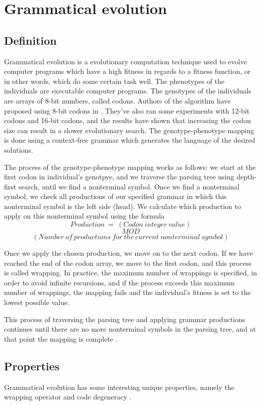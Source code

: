 \section{Grammatical evolution}
\subsection{Definition}
Grammatical evolution is a evolutionary computation technique used to evolve computer programs which have a high fitness in regards to a fitness function, or in other words, which do some certain task well. The phenotypes of the individuals are executable computer programs. The genotypes of the individuals are arrays of 8-bit numbers, called codons. Authors of the algorithm have proposed using 8-bit codons in \citep{neill2003grammaticalevolution}. They've also ran some experiments with 12-bit codons and 16-bit codons, and the results have shown that increasing the codon size can result in a slower evolutionary search. The genotype-phenotype mapping is done using a context-free grammar which generates the language of the desired solutions.

The process of the genotype-phenotype mapping works as follows: we start at the first codon in individual's genotpye, and we traverse the parsing tree using depth-first search, until we find a nonterminal symbol. Once we find a nonterminal symbol, we check all productions of our specified grammar in which this nonterminal symbol is the left side (head). We calculate which production to apply on this nonterminal symbol using the formula
\newpage
$$Production\:=\:(Codon\:integer\:value)$$
$$MOD$$ 
$$(Number\:of\:productions\:for\:the\:current\:nonterminal\:symbol)$$ 

Once we apply the chosen production, we move on to the next codon. If we have reached the end of the codon array, we move to the first codon, and this process is called wrapping. In practice, the maximum number of wrappings is specified, in order to avoid infinite recursions, and if the process exceeds this maximum number of wrappings, the mapping fails and the individual's fitness is set to the lowest possible value.

This process of traversing the parsing tree and applying grammar productions continues until there are no more nonterminal symbols in the parsing tree, and at that point the mapping is complete \citep{neill2003grammaticalevolution}.

\subsection{Properties}
Grammatical evolution has some interesting unique properties, namely the wrapping operator and code degeneracy \citep{neill2003grammaticalevolution}. 

